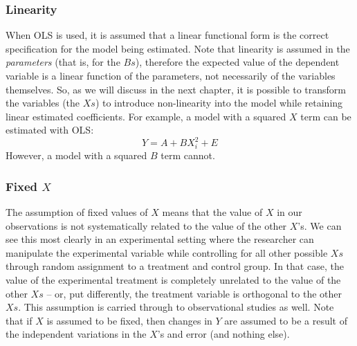 \documentclass[11pt,openany]{book}\usepackage[]{graphicx}\usepackage[]{color}
\begin{document}
{\begin{grbox}
\end{grbox}


\subsubsection{Linearity} 

When OLS is used, it is assumed that a linear functional form is the correct specification for the model being estimated. Note that linearity is assumed in the \textit{parameters} (that is, for the $Bs$), therefore the expected value of the dependent variable is a linear function of the
parameters, not necessarily of the variables themselves.  So, as we will discuss in the next chapter, it is possible to transform the variables 
(the $Xs$) to introduce non-linearity into the model while retaining linear estimated coefficients. For example, a model with a squared $X$ term can be estimated with OLS:
\begin{equation*}
  Y = A + BX^{2}_i + E
\end{equation*}
\noindent However, a model with a squared $B$ term cannot. 

\subsubsection{Fixed $X$} 

The assumption of fixed values of $X$ means that the value of $X$ in our observations is not systematically related to the value of the other $X$'s. We can see this most clearly in an experimental setting where the researcher  can manipulate the experimental variable while controlling for all other possible $Xs$ through random assignment to a treatment and control group. In that case, the value of the experimental treatment is completely unrelated to the value of the other $Xs$ -- or, put differently, the treatment variable is orthogonal to the other $Xs$. This assumption is carried through to observational studies as well. Note that if $X$ is assumed to be fixed, then changes in $Y$ are assumed to be a result of the independent variations in the $X$'s and error (and nothing else).    

}
\end{document}
